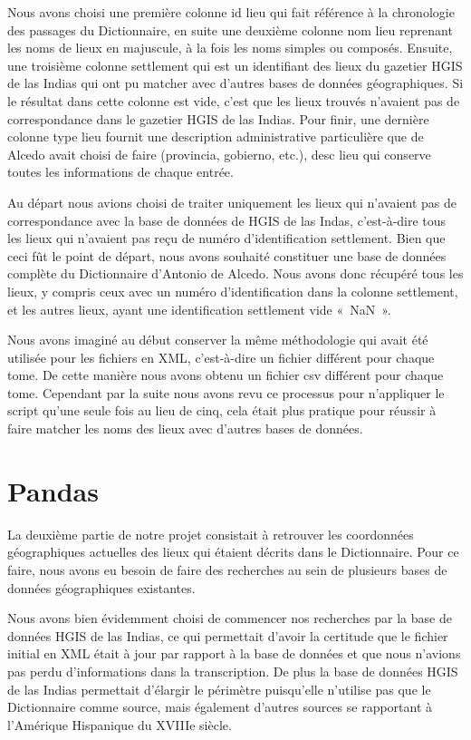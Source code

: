 \documentclass[a4paper,12pt,twoside]{book}
\begin{document}
Nous avons choisi une première colonne id lieu qui fait référence à la chronologie des passages du Dictionnaire, en suite une deuxième colonne nom lieu reprenant les noms de lieux en majuscule, à la fois les noms simples ou composés. Ensuite, une troisième colonne settlement qui est un identifiant des lieux du gazetier HGIS de las Indias qui ont pu matcher avec d’autres bases de données géographiques. Si le résultat dans cette colonne est vide, c’est que les lieux trouvés n’avaient pas de correspondance dans le gazetier HGIS de las Indias. Pour finir, une dernière colonne type lieu fournit une description administrative particulière que de Alcedo avait choisi de faire (provincia, gobierno, etc.), desc lieu qui conserve toutes les informations de chaque entrée.

Au départ nous avions choisi de traiter uniquement les lieux qui n’avaient pas de correspondance avec la base de données de HGIS de las Indas, c’est-à-dire tous les lieux qui n’avaient pas reçu de numéro d’identification settlement. Bien que ceci fût le point de départ, nous avons souhaité constituer une base de données complète du Dictionnaire d’Antonio de Alcedo. Nous avons donc récupéré tous les lieux, y compris ceux avec un numéro d’identification dans la colonne settlement, et les autres lieux, ayant une identification settlement vide « NaN ».

Nous avons imaginé au début conserver la même méthodologie qui avait été utilisée pour les fichiers en XML, c’est-à-dire un fichier différent pour chaque tome. De cette manière nous avons obtenu un fichier csv différent pour chaque tome. Cependant par la suite nous avons revu ce processus pour n’appliquer le script qu’une seule fois au lieu de cinq, cela était plus pratique pour réussir à faire matcher les noms des lieux avec d’autres bases de données. 



\section{Pandas}

La deuxième partie de notre projet consistait à retrouver les coordonnées géographiques actuelles des lieux qui étaient décrits dans le Dictionnaire. Pour ce faire, nous avons eu besoin de faire des recherches au sein de plusieurs bases de données géographiques existantes.

Nous avons bien évidemment choisi de commencer nos recherches par la base de données HGIS de las Indias, ce qui permettait d’avoir la certitude que le fichier initial en XML était à jour par rapport à la base de données et que nous n’avions pas perdu d’informations dans la transcription. De plus la base de données HGIS de las Indias permettait d’élargir le périmètre puisqu’elle n’utilise pas que le Dictionnaire comme source, mais également d’autres sources se  rapportant à l’Amérique Hispanique du XVIIIe siècle.  
\end{document}
